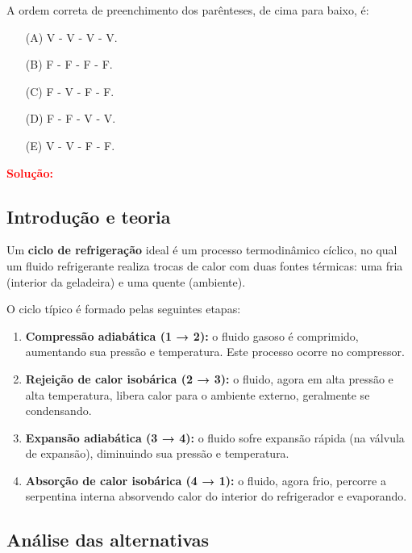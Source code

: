 \documentclass[a4paper,12pt]{article}
\begin{document}
\begin{flushleft}
A ordem correta de preenchimento dos parênteses, de cima para baixo, é: \underline{\hspace{3cm}}

\begin{itemize}
\item[(A)] V - V - V - V.
\item[(B)] F - F - F - F.
\item[(C)] F - V - F - F.
\item[(D)] F - F - V - V.
\item[(E)] V - V - F - F.
\end{itemize}

\vspace{0.5cm}

\textcolor{red}{\textbf{Solução:}}\\

\subsection*{Introdução e teoria}

Um \textbf{ciclo de refrigeração} ideal é um processo termodinâmico cíclico, no qual um fluido refrigerante realiza trocas de calor com duas fontes térmicas: uma fria (interior da geladeira) e uma quente (ambiente).  

O ciclo típico é formado pelas seguintes etapas:
\begin{enumerate}
    \item \textbf{Compressão adiabática (1 → 2):} o fluido gasoso é comprimido, aumentando sua pressão e temperatura. Este processo ocorre no compressor.
    \item \textbf{Rejeição de calor isobárica (2 → 3):} o fluido, agora em alta pressão e alta temperatura, libera calor para o ambiente externo, geralmente se condensando.
    \item \textbf{Expansão adiabática (3 → 4):} o fluido sofre expansão rápida (na válvula de expansão), diminuindo sua pressão e temperatura.
    \item \textbf{Absorção de calor isobárica (4 → 1):} o fluido, agora frio, percorre a serpentina interna absorvendo calor do interior do refrigerador e evaporando.
\end{enumerate}

\subsection*{Análise das alternativas}


\end{flushleft}
\end{document}
